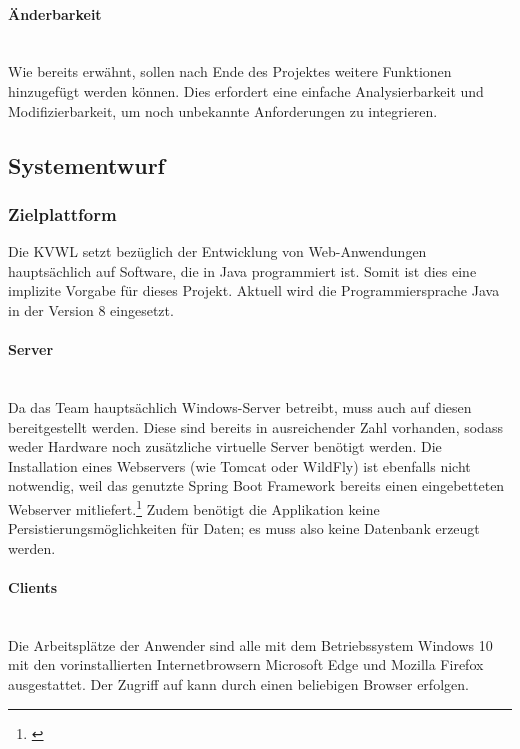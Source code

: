 \paragraph{Änderbarkeit} ~\\
\label{p:Aenderbarkeit}
Wie bereits erwähnt, sollen nach Ende des Projektes weitere Funktionen hinzugefügt werden können. Dies erfordert eine einfache Analysierbarkeit und Modifizierbarkeit, um noch unbekannte Anforderungen zu integrieren.

\subsection{Systementwurf}
\label{sec:Systementwurf}

\subsubsection{Zielplattform}
\label{sec:Systementwurf}
Die \ac{KVWL} setzt bezüglich der Entwicklung von Web-Anwendungen hauptsächlich auf Software, die in Java programmiert ist. Somit ist dies eine implizite Vorgabe für dieses Projekt. Aktuell wird die Programmiersprache Java in der Version 8 eingesetzt.

\paragraph{Server} ~\\
\label{p:Server}
 Da das Team \teamName hauptsächlich Windows-Server betreibt, muss auch \projektName auf diesen bereitgestellt werden. Diese sind bereits in ausreichender Zahl vorhanden, sodass weder Hardware noch zusätzliche virtuelle Server benötigt werden. Die Installation eines Webservers (wie Tomcat oder WildFly) ist ebenfalls nicht notwendig, weil das genutzte Spring Boot Framework bereits einen eingebetteten Webserver mitliefert.\footnote{\Vgl \cite{spring:web}} Zudem benötigt die Applikation keine Persistierungsmöglichkeiten für Daten; es muss also keine Datenbank erzeugt werden.
 
\paragraph{Clients} ~\\
\label{p:Clients}
 Die Arbeitsplätze der Anwender sind alle mit dem Betriebssystem Windows 10 mit den vorinstallierten Internetbrowsern Microsoft Edge und Mozilla Firefox ausgestattet. Der Zugriff auf \projektName kann durch einen beliebigen Browser erfolgen.


